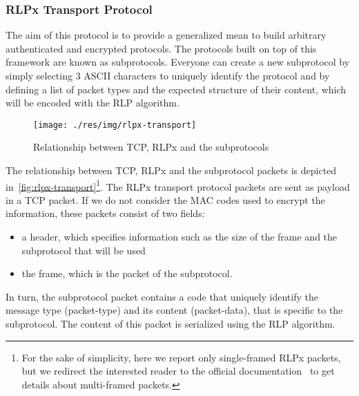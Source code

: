 \subsubsection{RLPx Transport Protocol}
\label{sec:rlpx-transport-protocol}

The aim of this protocol is to provide a generalized mean to build arbitrary
authenticated and encrypted protocols. The protocols built on top of this
framework are known as subprotocols. Everyone can create a new subprotocol by
simply selecting $3$ ASCII characters to uniquely identify the protocol and by
defining a list of packet types and the expected structure of their content,
which will be encoded with the RLP algorithm.

\begin{figure}
  \begin{center}
    \texttt{[image: ./res/img/rlpx-transport]}
    \caption{Relationship between TCP, RLPx and the subprotocols}
    \label{fig:rlpx-transport}
  \end{center}
\end{figure}

The relationship between TCP, RLPx and the subprotocol packets is depicted
in~\autoref{fig:rlpx-transport}\footnote{For the sake of simplicity, here we
report only single-framed RLPx packets, but we redirect the interested reader to
the official documentation~\cite{rlpx} to get details about multi-framed
packets.}. The RLPx transport protocol packets are sent as payload in a TCP
packet. If we do not consider the MAC codes used to encrypt the information,
these packets consist of two fields:
\begin{itemize}
  \item a header, which specifies information such as the size of the frame and
  the subprotocol that will be used
  \item the frame, which is the packet of the subprotocol.
\end{itemize}

In turn, the subprotocol packet contains a code that uniquely identify the
message type (packet-type) and its content (packet-data), that is specific to
the subprotocol. The content of this packet is serialized using the RLP
algorithm.

